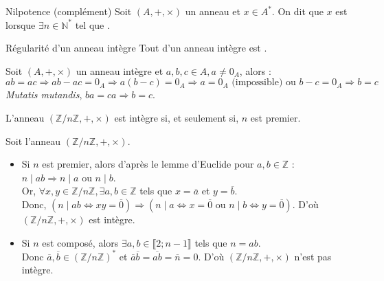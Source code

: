 \documentclass[12pt,a4paper]{report}
\begin{document}
    \begin{definition}{Nilpotence (complément)}{}
    Soit $(A, +, \times)$ un anneau et $x \in A^*$. On dit que $x$ est  lorsque $\exists n \in \mathbb{N}^*$ tel que .
    \end{definition}
    
    
    
    \begin{proposition}{Régularité d'un anneau intègre}{}
    Tout  d'un anneau intègre est .
    \end{proposition}
    
    \begin{demo}
    Soit $(A, +, \times)$ un anneau intègre et $a, b, c \in A, a \neq 0_A$, alors :
    $$ ab = ac \Rightarrow ab - ac = 0_A \Rightarrow a(b - c) = 0_A \Rightarrow a = 0_A \text{ (impossible) ou } b - c = 0_A \Rightarrow b = c $$
    \textit{Mutatis mutandis}, $ba = ca \Rightarrow b = c$.
    \end{demo}
    
    \begin{remarque}
    L'anneau $\left(\mathbb{Z}/n\mathbb{Z}, +, \times\right)$ est intègre si, et seulement si, $n$ est premier.
    \end{remarque}
    
    \begin{demo}
    Soit l'anneau $\left(\mathbb{Z}/n\mathbb{Z}, +, \times\right)$.
    \begin{itemize}[label=$\cdot$]
        \item Si $n$ est premier, alors d'après le lemme d'Euclide pour $a, b \in \mathbb{Z}$ : $n\mid ab \Rightarrow n \mid a$ ou $n \mid b$.\\
        Or, $\forall x, y \in \mathbb{Z}/n\mathbb{Z}, \exists a, b \in \mathbb{Z}$ tels que $x = \overline{a}$ et $y = \overline{b}$.\\
        Donc, $\left( n \mid ab \Leftrightarrow xy = \overline{0} \right) \Rightarrow \left( n \mid a \Leftrightarrow x = \overline{0} \text{ ou } n \mid b \Leftrightarrow y = \overline{0}\right)$. D'où $\left(\mathbb{Z}/n\mathbb{Z}, +, \times\right)$ est intègre.
        \item Si $n$ est composé, alors $\exists a, b \in \llbracket 2 ; n - 1 \rrbracket$ tels que $n = ab$.\\
        Donc $\overline{a}, \overline{b} \in \left(\mathbb{Z}/n\mathbb{Z}\right)^*$ et $\overline{a}\overline{b} = \overline{ab} = \overline{n} = 0$. D'où $\left(\mathbb{Z}/n\mathbb{Z}, +, \times\right)$ n'est pas intègre.
    \end{itemize}
    \end{demo}
    
\end{document}
